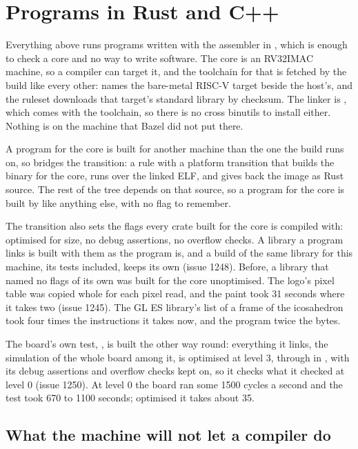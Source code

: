 \documentclass[journal,onecolumn,9pt]{IEEEtran}
\begin{document}
\section{Programs in Rust and C++}
\label{sec:v-rust}

Everything above runs programs written with the assembler in
, which is enough to check a core and no way to
write software. The core is an RV32IMAC machine, so a compiler can
target it, and the toolchain for that is fetched by the build like
every other:  names the bare-metal RISC-V target
beside the host's, and the ruleset downloads that target's standard
library by checksum. The linker is , which comes with
the toolchain, so there is no cross binutils to install either.
Nothing is on the machine that Bazel did not put there.

A program for the core is built for another machine than the one the
build runs on, so  bridges the transition: a rule
with a platform transition that builds the binary for the core, runs
 over the linked ELF, and gives back the
image as Rust source. The rest of the tree depends on that source, so
a program for the core is built by  like
anything else, with no flag to remember.

The transition also sets the flags every crate built for the core is
compiled with: optimised for size, no debug assertions, no overflow
checks. A library a program links is built with them as the program
is, and a build of the same library for this machine, its tests
included, keeps its own (issue 1248). Before, a library that named no
flags of its own was built for the core unoptimised. The logo's pixel
table was copied whole for each pixel read, and the paint took 31
seconds where it takes two (issue 1245). The GL ES library's list of
a frame of the icosahedron took four times the instructions it takes
now, and the program twice the bytes.

The board's own test, , is built the
other way round: everything it links, the simulation of the whole
board among it, is optimised at level 3, through  in
, with its debug assertions and overflow
checks kept on, so it checks what it checked at level 0 (issue 1250).
At level 0 the board ran some 1500 cycles a second and the test took
670 to 1100 seconds; optimised it takes about 35.

\subsection*{What the machine will not let a compiler do}
\end{document}
